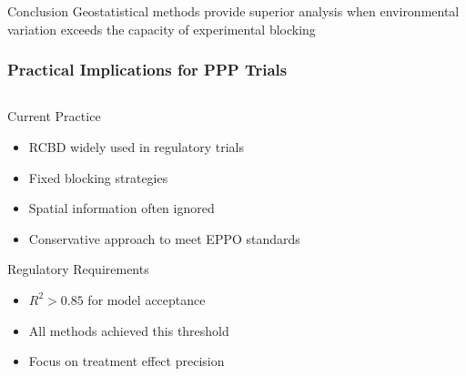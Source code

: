 \documentclass[aspectratio=43]{beamer}
\begin{document}
\begin{frame}
    \vspace{1em}
    
    \begin{alertblock}{Conclusion}
        Geostatistical methods provide superior analysis when environmental variation exceeds the capacity of experimental blocking
    \end{alertblock}
\end{frame}

\begin{frame}
    \frametitle{Practical Implications for PPP Trials}
    
    \begin{columns}[T]
        \begin{column}{0.5\textwidth}
            \begin{block}{Current Practice}
                \begin{itemize}
                    \item RCBD widely used in regulatory trials
                    \item Fixed blocking strategies
                    \item Spatial information often ignored
                    \item Conservative approach to meet EPPO standards
                \end{itemize}
            \end{block}
            
            \begin{block}{Regulatory Requirements}
                \begin{itemize}
                    \item $R^2 > 0.85$ for model acceptance
                    \item All methods achieved this threshold
                    \item Focus on treatment effect precision
                \end{itemize}
            \end{block}
        \end{column}
        

\end{columns}
\end{frame}
\end{document}

